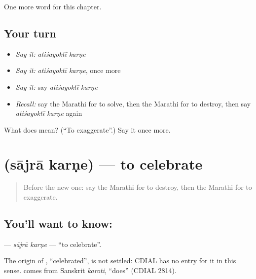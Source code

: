\begin{grammarlens}[title={What you've built}]
One more word for this chapter.
\end{grammarlens}

\subsection*{Your turn}
\begin{itemize}
\raggedright
  \item \emph{Say it:} \emph{atiśayoktī karṇe}
  \item \emph{Say it:} \emph{atiśayoktī karṇe}, once more
  \item \emph{Say it:} say \emph{atiśayoktī karṇe}
  \item \emph{Recall:} say the Marathi for to solve, then the Marathi for to destroy, then say \emph{atiśayoktī karṇe} again
\end{itemize}

\begin{tcolorbox}[breakable,colback=teal!4,colframe=teal!35!black,title={Before you move on}]
What does   mean? (\textquotedblleft{}To exaggerate\textquotedblright{}.) Say it once more.
\end{tcolorbox}
\section[\texorpdfstring{\mr{साजरा} \mr{करणे} (sājrā karṇe)}{साजरा करणे (sājrā karṇe)}]{  (sājrā karṇe) — to celebrate}

\label{lesson:MR-C227-sajra-karne}



\begin{quote}
Before the new one: say the Marathi for to destroy, then the Marathi for to exaggerate.
\end{quote}

\subsection*{You'll want to know:  }
\textbf{ } — \emph{sājrā karṇe} — \textquotedblleft{}to celebrate\textquotedblright{}.

\begin{cousinweb}
The origin of \textbf{}, \textquotedblleft{}celebrated\textquotedblright{}, is not settled: CDIAL has no entry for it in this sense. \textbf{} comes from Sanskrit \emph{karoti}, \textquotedblleft{}does\textquotedblright{} (CDIAL 2814).
\end{cousinweb}

